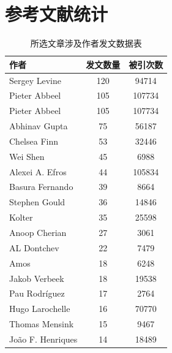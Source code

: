 \chapter{参考文献统计}


\begin{table}[htbp]
    \centering
        \begin{tabular}{lcc}
        \hline
        \textbf{作者}             & \multicolumn{1}{l}{\textbf{发文数量}} & \textbf{被引次数} \\ \hline
        Sergey   Levine         & 120                               & 94714         \\
        Pieter   Abbeel         & 105                               & 107734        \\
        Pieter   Abbeel         & 105                               & 107734        \\
        Abhinav   Gupta         & 75                                & 56187         \\
        Chelsea   Finn          & 53                                & 32446         \\
        Wei   Shen              & 45                                & 6988          \\
        Alexei   A. Efros       & 44                                & 105834        \\
        Basura   Fernando       & 39                                & 8664          \\
        Stephen   Gould         & 36                                & 14846         \\
        Kolter                  & 35                                & 25598         \\
        Anoop   Cherian         & 27                                & 3061          \\
        AL   Dontchev           & 22                                & 7479          \\
        Amos                    & 18                                & 6248          \\
        Jakob   Verbeek         & 18                                & 19538         \\
        Pau   Rodríguez         & 17                                & 2764          \\
        Hugo   Larochelle       & 16                                & 70770         \\
        Thomas   Mensink        & 15                                & 9467          \\
        João   F. Henriques     & 14                                & 18489         \\ \hline
        \end{tabular}
    
    \caption{所选文章涉及作者发文数据表}
    \label{table:a}
\end{table}


